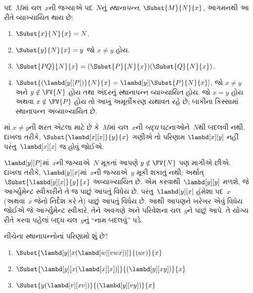 \begin{defn}[સ્થાનાપન્ન] 
  પદ~$M$માં ચલ~$x$ની જગ્યાએ પદ~$N$નું \emph{સ્થાનાપન્ન},
  $\Subst{M}{N}{x}$, આગમનથી આ રીતે વ્યાખ્યાયિત થાય છે:
  \begin{enumerate}
    \item $\Subst{x}{N}{x} = N$. 
    \item $\Subst{y}{N}{x}  = y$ જો $x \neq y$ હોય.
    \item $\Subst{PQ}{N}{x}  = (\Subst{P}{N}{x}) (\Subst{Q}{N}{x})$.
    \item $\Subst{(\lambd[y][P])}{N}{x} = \lambd[y][\Subst{P}{N}{x}]$,
      જો $x \neq y$ અને $y \notin \FV{N}$ હોય તથા અંદરનું
      સ્થાનાપન્ન વ્યાખ્યાયિત હોય. જો $x=y$ હોય અથવા
      $x\notin\FV{P}$ હોય તો આખું અમૂર્તીકરણ યથાવત રહે છે;
      બાકીના કિસ્સામાં સ્થાનાપન્ન અવ્યાખ્યાયિત છે.
  \end{enumerate}
\end{defn}

\begin{explain}
માં
$x \neq y$ની શરત એટલા માટે છે કે~$M$માં ચલ~$x$ની
\emph{બદ્ધ} ઘટનાઓને~$N$થી બદલવી નથી. દાખલા તરીકે,
$\Subst{\lambd[x][x]}{y}{x}$ ગણીએ તો પરિણામ
$\lambd[x][y]$ નહીં પરંતુ~$\lambd[x][x]$ જ હોવું જોઈએ.

$\lambd[y][P]$માં~$x$ની જગ્યાએ~$N$ મૂકતાં આપણે
$y \notin \FV{N}$ પણ માગીએ છીએ. દાખલા તરીકે,
$\lambd[y][x]$માં~$x$ની જગ્યાએ~$y$ મૂકી શકાતું નથી;
અર્થાત્~$\Subst{\lambd[y][x]}{y}{x}$ અવ્યાખ્યાયિત છે.
એમ કરવાથી~$\lambd[y][y]$ મળશે, જે આર્ગ્યુમેન્ટ સ્વીકારીને
તે જ પાછું આપતું વિધેય છે. પરંતુ~$\lambd[y][x]$ હંમેશા
પદ~$x$ (અથવા~$x$ જેનો નિર્દેશ કરે તે) પાછું આપતું વિધેય છે.
આથી આપણને ખરેખર એવું વિધેય જોઈએ જે આર્ગ્યુમેન્ટ સ્વીકારે,
તેને અવગણે અને પરિવેશના ચલ~$y$ને પાછું આપે. તે યોગ્ય રીતે
કરવા પહેલાં બદ્ધ ચલ~$y$નું ``નામ બદલવું'' પડે.
\end{explain}

\begin{prob}
  નીચેના સ્થાનાપન્નોનાં પરિણામો શું છે?
  \begin{enumerate}
  \item $\Subst{\lambd[y][x(\lambd[w][vwx])]}{(uv)}{x}$
  \item $\Subst{\lambd[y][x(\lambd[x][x])]}{(\lambd[y][xy])}{x}$
  \item $\Subst{y(\lambd[v][xv])}{(\lambd[y][vy])}{x}$
  \end{enumerate}
\end{prob}

